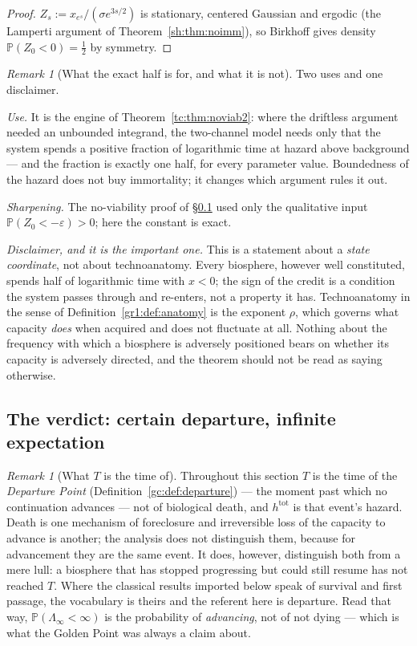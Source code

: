 \documentclass[11pt]{article}
\numberwithin{equation}{section}
\theoremstyle{plain}
\theoremstyle{definition}
\theoremstyle{remark}
\newtheorem{remark}[theorem]{Remark}
\newcommand{\PP}{\mathbb{P}}
\begin{document}
\begin{proof}
$Z_s:=x_{e^{s}}/(\sigma e^{3s/2})$ is stationary, centered Gaussian and
ergodic (the Lamperti argument of Theorem~\ref{sh:thm:noimm}), so
Birkhoff gives density $\PP(Z_0<0)=\tfrac12$ by symmetry.
\end{proof}

\begin{remark}[What the exact half is for, and what it is not]
\label{gr1:rem:halfuse}
Two uses and one disclaimer.

\emph{Use.} It is the engine of Theorem~\ref{tc:thm:noviab2}: where the
driftless argument needed an unbounded integrand, the two-channel model
needs only that the system spends a positive fraction of logarithmic
time at hazard above background --- and the fraction is exactly one
half, for every parameter value. Boundedness of the hazard does not buy
immortality; it changes which argument rules it out.

\emph{Sharpening.} The no-viability proof of
\S\ref{gr1:sub:verdict} used only the qualitative input
$\PP(Z_0<-\varepsilon)>0$; here the constant is exact.

\emph{Disclaimer, and it is the important one.} This is a statement
about a \emph{state coordinate}, not about technoanatomy. Every
biosphere, however well constituted, spends half of logarithmic time
with $x<0$; the sign of the credit is a condition the system passes
through and re-enters, not a property it has. Technoanatomy in the sense
of Definition~\ref{gr1:def:anatomy} is the exponent $\rho$, which governs
what capacity \emph{does} when acquired and does not fluctuate at all.
Nothing about the frequency with which a biosphere is adversely
positioned bears on whether its capacity is adversely directed, and the
theorem should not be read as saying otherwise.
\end{remark}


\subsection{The verdict: certain departure, infinite expectation}
\label{gr1:sub:verdict}\label{sh:sub:verdict}

\begin{remark}[What $T$ is the time of]\label{gr1:rem:whatTis}
Throughout this section $T$ is the time of the \emph{Departure Point}
(Definition~\ref{gc:def:departure}) --- the moment past which no
continuation advances --- not of biological death, and
$h^{\mathrm{tot}}$ is that event's hazard. Death is one mechanism of
foreclosure and irreversible loss of the capacity to advance is
another; the analysis does not distinguish them, because for
advancement they are the same event. It does, however, distinguish both
from a mere lull: a biosphere that has stopped progressing but could
still resume has not reached $T$. Where the classical results imported below speak of survival
and first passage, the vocabulary is theirs and the referent here is
departure. Read that way, $\PP(\Lambda_\infty<\infty)$ is the
probability of \emph{advancing}, not of not dying --- which is what the
Golden Point was always a claim about.
\end{remark}
\end{document}
